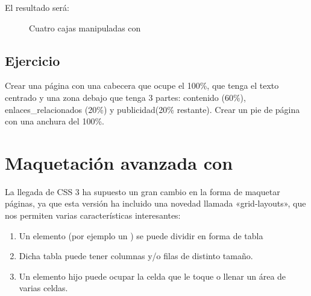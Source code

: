 \documentclass[letterpaper,10pt,spanish]{sphinxmanual}
\begin{document}
\begin{sphinxVerbatim}[commandchars=\\\{\}]
 
 
\end{sphinxVerbatim}

El resultado será:

\begin{figure}[htbp]
\centering
\capstart

\noindent{}
\caption{Cuatro cajas manipuladas con }\label{\detokenize{tema3:id7}}\end{figure}


\subsection{Ejercicio}
\label{\detokenize{tema3:id4}}
Crear una página con una cabecera que ocupe el 100\%, que tenga el texto centrado y una zona debajo que tenga 3 partes: contenido (60\%), enlaces\_relacionados (20\%) y publicidad(20\% restante). Crear un pie de página con una anchura del 100\%.


\section{Maquetación avanzada con }
\label{\detokenize{tema3:maquetacion-avanzada-con-grid-layouts}}
La llegada de CSS 3 ha supuesto un gran cambio en la forma de maquetar páginas, ya que esta versión ha incluido una novedad llamada «grid-layouts», que nos permiten varias características interesantes:
\begin{enumerate}
\item {} 
Un elemento (por ejemplo un ) se puede dividir en forma de tabla

\item {} 
Dicha tabla puede tener columnas y/o filas de distinto tamaño.

\item {} 
Un elemento hijo puede ocupar la celda que le toque o llenar un área de varias celdas.

\end{enumerate}
\end{document}
